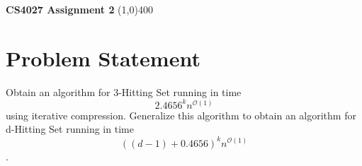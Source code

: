 \documentclass{article}
\begin{document}
\begin{center}
{\huge \textbf{CS4027 Assignment 2}}
\line(1,0){400}
\end{center}
\section{Problem Statement}

Obtain an algorithm for 3-Hitting Set running in time \[ 2.4656^k n^{\mathcal{O}(1)} \] using iterative compression. Generalize this algorithm to obtain an algorithm for d-Hitting Set running in time \[ ((d-1) + 0.4656)^k n^{\mathcal{O}(1)} \] .
\end{document}
